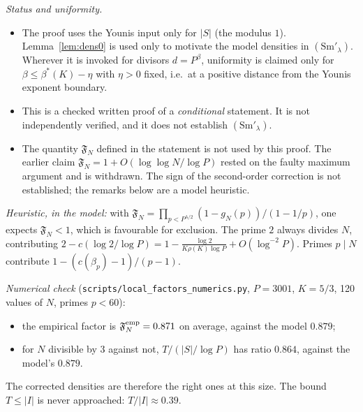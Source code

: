 \documentclass[11pt,a4paper]{article}
\theoremstyle{remark}
\begin{document}
\noindent\emph{Status and uniformity.}
\begin{itemize}
\item The proof uses the Younis input only for $|S|$ (the modulus $1$). Lemma~\ref{lem:dens0} is used only to motivate the
model densities in $(\mathrm{Sm}'_\lambda)$. Wherever it is invoked for divisors $d=P^\beta$, uniformity is claimed only for
$\beta\le\beta^*(K)-\eta$ with $\eta>0$ fixed, i.e.\ at a positive distance from the Younis exponent boundary.
\item This is a checked written proof of a \emph{conditional} statement. It is not independently verified, and it does not
establish $(\mathrm{Sm}'_\lambda)$.
\item The quantity $\mathfrak F_N$ defined in the statement is not used by this proof. The earlier claim
$\mathfrak F_N=1+O(\log\log N/\log P)$ rested on the faulty maximum argument and is withdrawn. The sign of the second-order
correction is not established; the remarks below are a model heuristic.
\end{itemize}

\emph{Heuristic, in the model:} with $\mathfrak F_N=\prod_{p<P^{\lambda/2}}(1-g_N(p))/(1-1/p)$, one expects $\mathfrak F_N<1$, which is favourable for exclusion. The prime $2$ always divides $N$, contributing
$2-c(\log2/\log P)=1-\frac{\log2}{K\rho(K)\log P}+O(\log^{-2}P)$. Primes $p\mid N$ contribute $1-(c(\beta_p)-1)/(p-1)$.

\emph{Numerical check} (\texttt{scripts/local\_factors\_numerics.py}, $P=3001$, $K=5/3$, 120 values of $N$, primes $p<60$):
\begin{itemize}
\item the empirical factor is $\mathfrak F^{\rm emp}_N=0.871$ on average, against the model $0.879$;
\item for $N$ divisible by $3$ against not, $T/(|S|/\log P)$ has ratio $0.864$, against the model's $0.879$.
\end{itemize}
The corrected densities are therefore the right ones at this size. The bound $T\le|I|$ is never approached: $T/|I|\approx0.39$.
\end{document}
